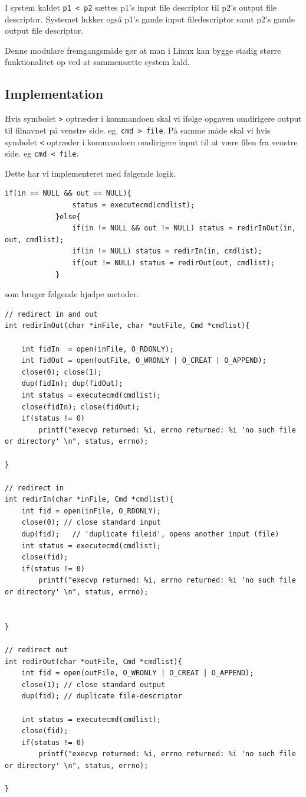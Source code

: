 \documentclass[danish]{report}
\begin{document}
I system kaldet  {\tt p1 < p2} sættes p1's input file descriptor til p2's output file descriptor. Systemet lukker også p1's gamle input filedescriptor samt p2's gamle output file descriptor. 

Denne modulare fremgangsmåde gør at man i Linux kan bygge stadig større funktionalitet op ved at sammensætte system kald.  
   
\subsection{Implementation}
Hvis symbolet {\tt >} optræder i kommandoen skal vi ifølge opgaven omdirigere output til filnavnet på venstre side. eg. {\tt cmd > file}. På samme måde skal vi hvis symbolet {\tt <} optræder i kommandoen omdirigere input til at være filen fra venstre side. eg {\tt cmd < file}. 

Dette har vi implementeret med følgende logik.

\begin{lstlisting}
if(in == NULL && out == NULL){
                status = executecmd(cmdlist);
            }else{
                if(in != NULL && out != NULL) status = redirInOut(in, out, cmdlist);
                if(in != NULL) status = redirIn(in, cmdlist);
                if(out != NULL) status = redirOut(out, cmdlist);
            }
\end{lstlisting}

som bruger følgende hjælpe metoder.

\begin{lstlisting}
// redirect in and out
int redirInOut(char *inFile, char *outFile, Cmd *cmdlist){
    
    int fidIn  = open(inFile, O_RDONLY);
    int fidOut = open(outFile, O_WRONLY | O_CREAT | O_APPEND);              
    close(0); close(1);
    dup(fidIn); dup(fidOut);
    int status = executecmd(cmdlist);
    close(fidIn); close(fidOut);
    if(status != 0) 
        printf("execvp returned: %i, errno returned: %i 'no such file or directory' \n", status, errno);

}

// redirect in
int redirIn(char *inFile, Cmd *cmdlist){
    int fid = open(inFile, O_RDONLY);  
    close(0); // close standard input
    dup(fid);   // 'duplicate fileid', opens another input (file)    
    int status = executecmd(cmdlist);
    close(fid);             
    if(status != 0) 
        printf("execvp returned: %i, errno returned: %i 'no such file or directory' \n", status, errno);


}

// redirect out
int redirOut(char *outFile, Cmd *cmdlist){
    int fid = open(outFile, O_WRONLY | O_CREAT | O_APPEND);         
    close(1); // close standard output
    dup(fid); // duplicate file-descriptor

    int status = executecmd(cmdlist);
    close(fid);             
    if(status != 0) 
        printf("execvp returned: %i, errno returned: %i 'no such file or directory' \n", status, errno);

}
\end{lstlisting}
\end{document}
